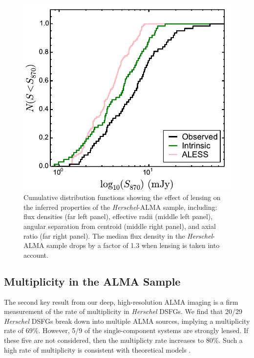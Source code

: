 \documentclass[iop]{emulateapj}
\begin{document}
\begin{figure}[!tbp] 
\includegraphics[width=\linewidth]{../Figures/f870_delens.pdf}

\caption{ Cumulative distribution functions showing the effect of lensing on
the inferred properties of the {\it Herschel}-ALMA sample, including: flux densities (far left
panel), effective radii (middle left panel), angular separation from centroid
(middle right panel), and axial ratio (far right panel).  The median flux
density in the {\it Herschel}-ALMA sample drops by a factor of 1.3 when lensing is taken into
account.  } \label{fig:delens}

\end{figure}

\subsection{Multiplicity in the ALMA Sample}\label{sec:multiplicity}

The second key result from our deep, high-resolution ALMA imaging is a firm
measurement of the rate of multiplicity in {\it Herschel} DSFGs.  We find that
20/29 {\it Herschel} DSFGs break down into multiple ALMA sources, implying a
multiplicity rate of 69\%.  
However, 5/9 of the single-component
systems are strongly lensed.  If these five are not considered, then the
multiplicty rate increases to 80\%.  Such a high rate of multiplicity is
consistent with theoretical models \citep[e.g.,][]{HN13, HB13}.
\end{document}
